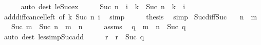 \begin{isabellebody}
\ \ \ \ \isamarkupfalse%
\ {\isacharparenleft}{\kern0pt}auto\ dest{\isacharcolon}{\kern0pt}\ le{\isacharunderscore}{\kern0pt}Suc{\isacharunderscore}{\kern0pt}ex{\isacharparenright}{\kern0pt}\isanewline
\ \ \isamarkupfalse%
\ \isamarkupfalse%
\ {\isachardoublequoteopen}Suc\ n\ {\isacharminus}{\kern0pt}\ i\ {\isacharequal}{\kern0pt}\ {\isacharparenleft}{\kern0pt}k\ {\isacharplus}{\kern0pt}\ Suc\ n{\isacharparenright}{\kern0pt}\ {\isacharminus}{\kern0pt}\ {\isacharparenleft}{\kern0pt}k\ {\isacharplus}{\kern0pt}\ i{\isacharparenright}{\kern0pt}{\isachardoublequoteclose}\isanewline
\ \ \ \ \isamarkupfalse%
\ add{\isacharunderscore}{\kern0pt}diff{\isacharunderscore}{\kern0pt}cancel{\isacharunderscore}{\kern0pt}left\ {\isacharbrackleft}{\kern0pt}of\ k\ {\isachardoublequoteopen}Suc\ n{\isachardoublequoteclose}\ i{\isacharbrackright}{\kern0pt}\ \isamarkupfalse%
\ simp\isanewline
\ \ \isamarkupfalse%
\ \isamarkupfalse%
\ {\isacharquery}{\kern0pt}thesis\ \isamarkupfalse%
\ simp\isanewline
{}\isamarkupfalse%
%
\endisatagproof
{\isafoldproof}%
%
\isadelimproof
\isanewline
%
\endisadelimproof
\isanewline
{}\isamarkupfalse%
\ Suc{\isacharunderscore}{\kern0pt}diff{\isacharunderscore}{\kern0pt}Suc{\isacharcolon}{\kern0pt}\isanewline
\ \ \ {\isachardoublequoteopen}n\ {\isacharless}{\kern0pt}\ m{\isachardoublequoteclose}\isanewline
\ \ \ {\isachardoublequoteopen}Suc\ {\isacharparenleft}{\kern0pt}m\ {\isacharminus}{\kern0pt}\ Suc\ n{\isacharparenright}{\kern0pt}\ {\isacharequal}{\kern0pt}\ m\ {\isacharminus}{\kern0pt}\ n{\isachardoublequoteclose}\isanewline
%
\isadelimproof
%
\endisadelimproof
%
\isatagproof
{}\isamarkupfalse%
\ {\isacharminus}{\kern0pt}\isanewline
\ \ \isamarkupfalse%
\ assms\ \isamarkupfalse%
\ q\ \ {\isachardoublequoteopen}m\ {\isacharequal}{\kern0pt}\ n\ {\isacharplus}{\kern0pt}\ Suc\ q{\isachardoublequoteclose}\isanewline
\ \ \ \ \isamarkupfalse%
\ {\isacharparenleft}{\kern0pt}auto\ dest{\isacharcolon}{\kern0pt}\ less{\isacharunderscore}{\kern0pt}imp{\isacharunderscore}{\kern0pt}Suc{\isacharunderscore}{\kern0pt}add{\isacharparenright}{\kern0pt}\isanewline
\ \ \isamarkupfalse%
\ \isamarkupfalse%
\ r\ \ {\isachardoublequoteopen}r\ {\isacharequal}{\kern0pt}\ Suc\ q{\isachardoublequoteclose}\isanewline
\ \ \isamarkupfalse%

\end{isabellebody}
